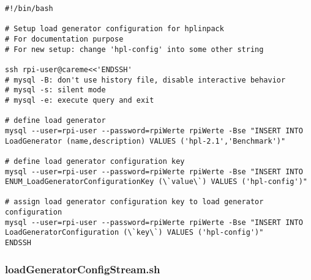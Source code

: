 \begin{verbatim}
#!/bin/bash 

# Setup load generator configuration for hplinpack 
# For documentation purpose 
# For new setup: change 'hpl-config' into some other string

ssh rpi-user@careme<<'ENDSSH'                                                                                                                                               
# mysql -B: don't use history file, disable interactive behavior                                                                                                           
# mysql -s: silent mode                                                                                                                                                                
# mysql -e: execute query and exit

# define load generator                                                                                                                                                    
mysql --user=rpi-user --password=rpiWerte rpiWerte -Bse "INSERT INTO 
LoadGenerator (name,description) VALUES ('hpl-2.1','Benchmark')"                                    

# define load generator configuration key                                                                                                                                  
mysql --user=rpi-user --password=rpiWerte rpiWerte -Bse "INSERT INTO 
ENUM_LoadGeneratorConfigurationKey (\`value\`) VALUES ('hpl-config')"                               

# assign load generator configuration key to load generator configuration                                                                                                  
mysql --user=rpi-user --password=rpiWerte rpiWerte -Bse "INSERT INTO 
LoadGeneratorConfiguration (\`key\`) VALUES ('hpl-config')"                                            
ENDSSH
\end{verbatim}

\subsubsection{loadGeneratorConfigStream.sh}

